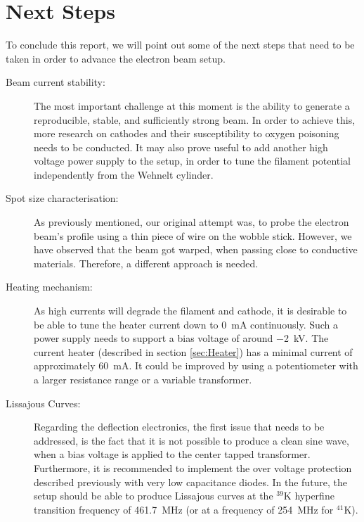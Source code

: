 
\chapter{Next Steps}
 
To conclude this report, we will point out some of the next steps that need to be taken in order to advance the electron beam setup. 

\begin{description}
	\item[Beam current stability:] The most important challenge at this moment is the ability to generate a reproducible, stable, and sufficiently strong beam. In order to achieve this, more research on cathodes and their susceptibility to oxygen poisoning needs to be conducted. It may also prove useful to add another high voltage power supply to the setup, in order to tune the filament potential independently from the Wehnelt cylinder. 
	\item[Spot size characterisation:] As previously mentioned, our original attempt was, to probe the electron beam's profile using a thin piece of wire on the wobble stick. However, we have observed that the beam got warped, when passing close to conductive materials. Therefore, a different approach is needed. 
	\item[Heating mechanism:] As high currents will degrade the filament and cathode, it is desirable to be able to tune the heater current down to \SI{0}{\milli\ampere} continuously. Such a power supply needs to support a bias voltage of around \SI{-2}{\kilo\volt}. The current heater (described in section \cref{sec:Heater}) has a minimal current of approximately \SI{60}{\milli\ampere}. It could be improved by using a potentiometer with a larger resistance range or a variable transformer. 
	\item[Lissajous Curves:] Regarding the deflection electronics, the first issue that needs to be addressed, is the fact that it is not possible to produce a clean sine wave, when a bias voltage is applied to the center tapped transformer. Furthermore, it is recommended to implement the over voltage protection described previously with very low capacitance diodes.  
	In the future, the setup should be able to produce Lissajous curves at the  $^{39}\mathrm{K}$ hyperfine transition frequency of \SI{461.7}{\mega\hertz} (or at a frequency of \SI{254}{\mega\hertz} for $^{41}\mathrm{K}$). 

\end{description}